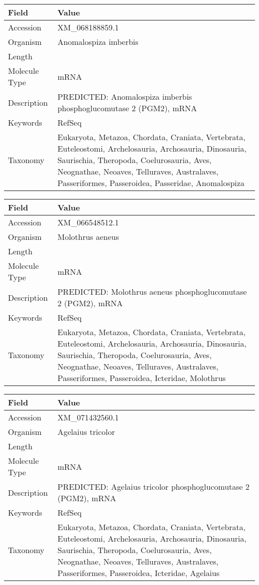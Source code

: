 \documentclass[10pt]{article}
\begin{document}
{\footnotesize
\begin{longtable}{>{\raggedright\arraybackslash}p{4.5cm} >{\raggedright\arraybackslash}p{11.5cm}}
\textbf{Field} & \textbf{Value} \\
\hline
Accession & XM\_068188859.1 \\
Organism & Anomalospiza imberbis \\
Length & 2202 \\
Molecule Type & mRNA \\
Description & PREDICTED: Anomalospiza imberbis phosphoglucomutase 2 (PGM2), mRNA \\
Keywords & RefSeq \\
Taxonomy & Eukaryota, Metazoa, Chordata, Craniata, Vertebrata, Euteleostomi, Archelosauria, Archosauria, Dinosauria, Saurischia, Theropoda, Coelurosauria, Aves, Neognathae, Neoaves, Telluraves, Australaves, Passeriformes, Passeroidea, Passeridae, Anomalospiza \\
\end{longtable}
}

{\footnotesize
\begin{longtable}{>{\raggedright\arraybackslash}p{4.5cm} >{\raggedright\arraybackslash}p{11.5cm}}
\textbf{Field} & \textbf{Value} \\
\hline
Accession & XM\_066548512.1 \\
Organism & Molothrus aeneus \\
Length & 2229 \\
Molecule Type & mRNA \\
Description & PREDICTED: Molothrus aeneus phosphoglucomutase 2 (PGM2), mRNA \\
Keywords & RefSeq \\
Taxonomy & Eukaryota, Metazoa, Chordata, Craniata, Vertebrata, Euteleostomi, Archelosauria, Archosauria, Dinosauria, Saurischia, Theropoda, Coelurosauria, Aves, Neognathae, Neoaves, Telluraves, Australaves, Passeriformes, Passeroidea, Icteridae, Molothrus \\
\end{longtable}
}

{\footnotesize
\begin{longtable}{>{\raggedright\arraybackslash}p{4.5cm} >{\raggedright\arraybackslash}p{11.5cm}}
\textbf{Field} & \textbf{Value} \\
\hline
Accession & XM\_071432560.1 \\
Organism & Agelaius tricolor \\
Length & 2542 \\
Molecule Type & mRNA \\
Description & PREDICTED: Agelaius tricolor phosphoglucomutase 2 (PGM2), mRNA \\
Keywords & RefSeq \\
Taxonomy & Eukaryota, Metazoa, Chordata, Craniata, Vertebrata, Euteleostomi, Archelosauria, Archosauria, Dinosauria, Saurischia, Theropoda, Coelurosauria, Aves, Neognathae, Neoaves, Telluraves, Australaves, Passeriformes, Passeroidea, Icteridae, Agelaius \\
\end{longtable}
}
\end{document}
